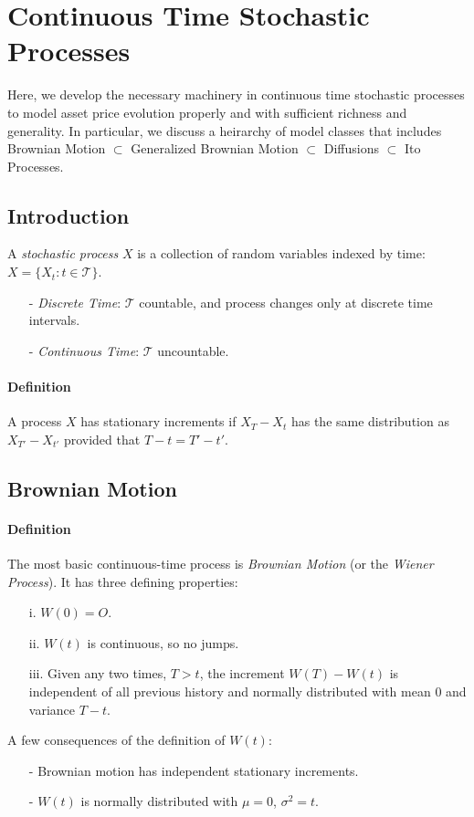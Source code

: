 \documentclass[a4paper,12pt]{scrartcl}
\begin{document}
\newpage


\section{Continuous Time Stochastic Processes}

Here, we develop the necessary machinery in continuous time stochastic
processes to model asset price evolution properly and with sufficient
richness and generality. In particular, we discuss a heirarchy of model
classes that includes Brownian Motion $\subset$ Generalized Brownian
Motion $\subset$ Diffusions $\subset$ Ito Processes.

\subsection{Introduction}

A \emph{stochastic process} $X$ is a collection of random variables
indexed by time: $X = \{ X_t: t \in \mathcal{T} \}$. 
\begin{itemize}
   \item[-]{\emph{Discrete Time}: $\mathcal{T}$ countable, and process
      changes only at discrete time intervals.}
   \item[-]{\emph{Continuous Time}: $\mathcal{T}$ uncountable.}
\end{itemize}
\paragraph{Definition} A process $X$ has stationary increments if 
$X_T - X_t$ has the same distribution as $X_{T'} - X_{t'}$ provided
that $T-t= T'-t'$.

\subsection{Brownian Motion}

\paragraph{Definition} The most basic continuous-time process is 
\emph{Brownian Motion} (or the \emph{Wiener Process}).  It has three
defining properties:
\begin{enumerate}
   \item[i.]{$W(0) = O$.}
   \item[ii.]{$W(t)$ is continuous, so no jumps.}
   \item[iii.]{Given any two times, $T>t$, the increment $W(T) - W(t)$ is
      independent of all previous history and normally distributed
      with mean $0$ and variance $T-t$.}
\end{enumerate}
A few consequences of the definition of $W(t)$:
\begin{itemize}
   \item[-]{Brownian motion has independent stationary increments.}
   \item[-]{$W(t)$ is normally distributed with $\mu =0$, $\sigma^2 = t$.
      }
\end{itemize}
\end{document}
